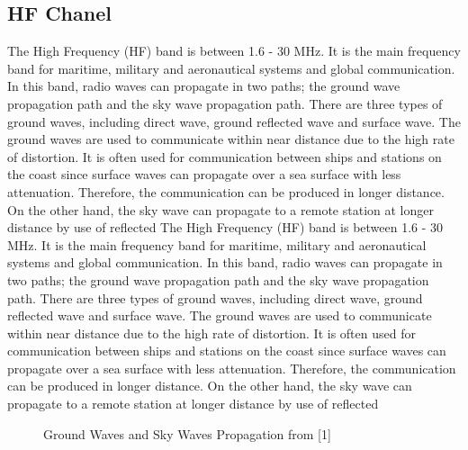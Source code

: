 \documentclass[conference]{IEEEtran}
\begin{document}
	\subsection{HF Chanel}
The High Frequency (HF) band is between 1.6 - 30 MHz. It is the main frequency band for maritime, military and aeronautical systems and global communication. In this band, radio waves can propagate in two paths; the ground wave propagation path and the sky wave propagation path. There are three types of ground waves, including direct wave, ground reflected wave and surface wave. The ground waves are used to communicate within near distance due to the high rate of distortion. It is often used for communication between ships and stations on the coast since surface waves can propagate over a sea surface with less attenuation. Therefore, the communication can be produced in longer distance. On the other hand, the sky wave can propagate to a remote station at longer distance by use of reflected 
The High Frequency (HF) band is between 1.6 - 30 MHz. It is the main frequency band for maritime, military and aeronautical systems and global communication. In this band, radio waves can propagate in two paths; the ground wave propagation path and the sky wave propagation path. There are three types of ground waves, including direct wave, ground reflected wave and surface wave. The ground waves are used to communicate within near distance due to the high rate of distortion. It is often used for communication between ships and stations on the coast since surface waves can propagate over a sea surface with less attenuation. Therefore, the communication can be produced in longer distance. On the other hand, the sky wave can propagate to a remote station at longer distance by use of reflected 

\begin{figure}[h!]
	\centering
	\caption{Ground Waves and Sky Waves Propagation from [1]}
\end{figure}
\end{document}
